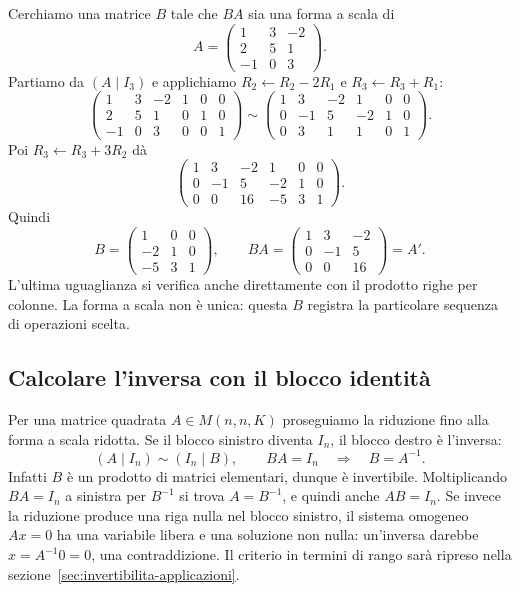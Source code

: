 \begin{esempio}
Cerchiamo una matrice $B$ tale che $BA$ sia una forma a scala di
\[
 A=\begin{pmatrix}1&3&-2\\2&5&1\\-1&0&3\end{pmatrix}.
\]
Partiamo da $(A\mid I_3)$ e applichiamo $R_2\leftarrow R_2-2R_1$ e $R_3\leftarrow R_3+R_1$:
\[
 \left(\begin{array}{rrr|rrr}1&3&-2&1&0&0\\2&5&1&0&1&0\\-1&0&3&0&0&1\end{array}\right)
 \sim\left(\begin{array}{rrr|rrr}1&3&-2&1&0&0\\0&-1&5&-2&1&0\\0&3&1&1&0&1\end{array}\right).
\]
Poi $R_3\leftarrow R_3+3R_2$ dà
\[
 \left(\begin{array}{rrr|rrr}1&3&-2&1&0&0\\0&-1&5&-2&1&0\\0&0&16&-5&3&1\end{array}\right).
\]
Quindi
\[
 B=\begin{pmatrix}1&0&0\\-2&1&0\\-5&3&1\end{pmatrix},\qquad
 BA=\begin{pmatrix}1&3&-2\\0&-1&5\\0&0&16\end{pmatrix}=A'.
\]
L'ultima uguaglianza si verifica anche direttamente con il prodotto righe per colonne. La forma a scala non è unica: questa $B$ registra la particolare sequenza di operazioni scelta.
\end{esempio}

\subsection{Calcolare l'inversa con il blocco identità}
Per una matrice quadrata $A\in M(n,n,K)$ proseguiamo la riduzione fino alla forma a scala ridotta. Se il blocco sinistro diventa $I_n$, il blocco destro è l'inversa:
\[
 (A\mid I_n)\sim(I_n\mid B),\qquad BA=I_n\quad\Longrightarrow\quad B=A^{-1}.
\]
Infatti $B$ è un prodotto di matrici elementari, dunque è invertibile. Moltiplicando $BA=I_n$ a sinistra per $B^{-1}$ si trova $A=B^{-1}$, e quindi anche $AB=I_n$. Se invece la riduzione produce una riga nulla nel blocco sinistro, il sistema omogeneo $Ax=0$ ha una variabile libera e una soluzione non nulla: un'inversa darebbe $x=A^{-1}0=0$, una contraddizione. Il criterio in termini di rango sarà ripreso nella sezione~\ref{sec:invertibilita-applicazioni}.

